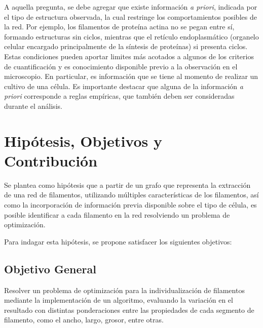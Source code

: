\documentclass{article}
\begin{document}
A aquella pregunta, se debe agregar que existe informaci\'on \textit{a priori}, indicada por el tipo de estructura observada, la cual restringe los comportamientos posibles de la red. Por ejemplo, los filamentos de prote\'ina actina no se pegan entre s\'i, formando estructuras sin ciclos, mientras que el ret\'iculo endoplasm\'atico (organelo celular encargado principalmente de la s\'intesis de prote\'inas) si presenta ciclos. Estas condiciones pueden aportar limites m\'as acotados a algunos de los criterios de cuantificaci\'on y es conocimiento disponible previo a la observaci\'on en el microscopio. En particular, es informaci\'on que se tiene al momento de realizar un cultivo de una c\'elula. 
Es importante destacar que alguna de la informaci\'on {\it a priori} corresponde a reglas emp\'iricas, que tambi\'en deben ser consideradas durante el an\'alisis.




\section{Hipótesis, Objetivos y Contribuci\'on}
\label{hipotesis}

Se plantea como hip\'otesis que a partir de un grafo que representa la extracci\'on de una red de filamentos, utilizando m\'ultiples caracter\'isticas de los filamentos, as\'i como la incorporaci\'on de informaci\'on previa disponible sobre el tipo de c\'elula, es posible identificar a cada filamento en la red resolviendo un problema de optimizaci\'on.


Para indagar esta hip\'otesis, se propone satisfacer los siguientes objetivos:
\subsection{Objetivo General}
Resolver un problema de optimizaci\'on para la individualizaci\'on de filamentos mediante la implementaci\'on de un algoritmo, evaluando la variaci\'on en el resultado con distintas ponderaciones entre las propiedades de cada segmento de filamento, como el ancho, largo, grosor, entre otras.
\end{document}
